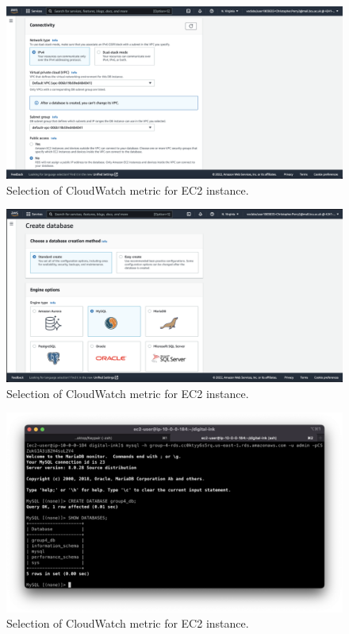 \begin{figure}[!htbp]
    \centering
    \includegraphics[width=\textwidth]{resources/rds/rds-connectivity-1.png}
    \caption{Selection of CloudWatch metric for EC2 instance.}
    \label{fig:rds-connect}
\end{figure}

\begin{figure}[!htbp]
    \centering
    \includegraphics[width=\textwidth]{resources/rds/rds-create-engine.png}
    \caption{Selection of CloudWatch metric for EC2 instance.}
    \label{fig:rds-engine}
\end{figure}

\begin{figure}[!htbp]
    \centering
    \includegraphics[width=\textwidth]{resources/rds/rds-database-creation.png}
    \caption{Selection of CloudWatch metric for EC2 instance.}
    \label{fig:rds-db-create}
\end{figure}

